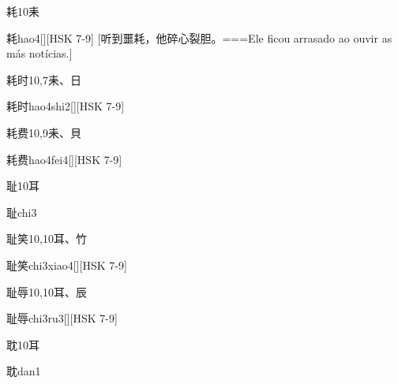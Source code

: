 \begin{Entry}{耗}{10}{⽾}
  \begin{Phonetics}{耗}{hao4}[][HSK 7-9]
    [听到噩耗，他碎心裂胆。===Ele ficou arrasado ao ouvir as más notícias.]
  \end{Phonetics}
\end{Entry}

\begin{Entry}{耗时}{10,7}{⽾、⽇}
  \begin{Phonetics}{耗时}{hao4shi2}[][HSK 7-9]
  \end{Phonetics}
\end{Entry}

\begin{Entry}{耗费}{10,9}{⽾、⾙}
  \begin{Phonetics}{耗费}{hao4fei4}[][HSK 7-9]
  \end{Phonetics}
\end{Entry}

\begin{Entry}{耻}{10}{⽿}
  \begin{Phonetics}{耻}{chi3}
  \end{Phonetics}
\end{Entry}

\begin{Entry}{耻笑}{10,10}{⽿、⽵}
  \begin{Phonetics}{耻笑}{chi3xiao4}[][HSK 7-9]
  \end{Phonetics}
\end{Entry}

\begin{Entry}{耻辱}{10,10}{⽿、⾠}
  \begin{Phonetics}{耻辱}{chi3ru3}[][HSK 7-9]
  \end{Phonetics}
\end{Entry}

\begin{Entry}{耽}{10}{⽿}
  \begin{Phonetics}{耽}{dan1}
  \end{Phonetics}
\end{Entry}


